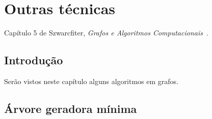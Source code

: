 \chapter{Outras técnicas}

Capítulo 5 de Szwarcfiter, \textit{Grafos e Algoritmos Computacionais}~\cite{Szwarcfiter1986grafos}.

\section{Introdução}

Serão vistos neste capítulo alguns algoritmos em grafos.

\section{Árvore geradora mínima}

